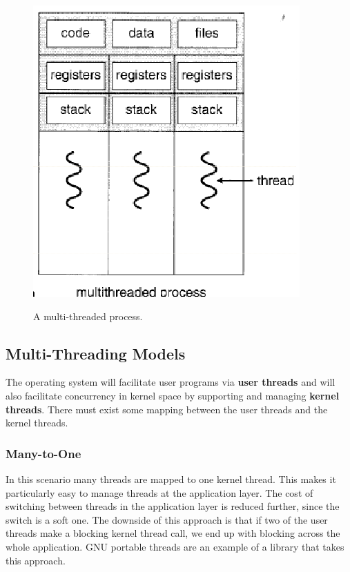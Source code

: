 \documentclass[10pt,a4paper]{article}
\begin{document}
\begin{figure}
\caption{A multi-threaded process. \cite{OSCONCEPTS}}
\begin{center}
\includegraphics[scale=0.55]{../images/multi-threaded-process.png}
\label{processthread}
\end{center}
\end{figure}
\subsection{Multi-Threading Models}
The operating system will facilitate user programs via {\bf user threads} and will also facilitate concurrency in kernel space by supporting and managing {\bf kernel threads}. There must exist some mapping between the user threads and the kernel threads.
\subsubsection{Many-to-One}
In this scenario many threads are mapped to one kernel thread. This makes it particularly easy to manage threads at the application layer. The cost of switching between threads in the application layer is reduced further, since the switch is a soft one. The downside of this approach is that if two of the user threads make a blocking kernel thread call, we end up with blocking across the whole application. GNU portable threads are an example of a library that takes this approach.  
\end{document}
